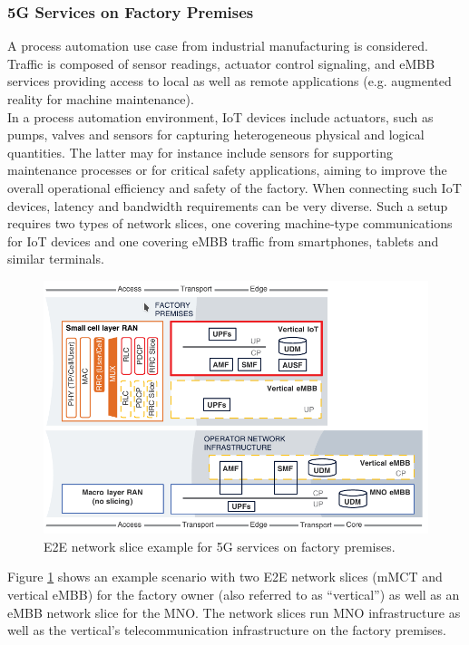\documentclass{report}
\begin{document}
\subsubsection{5G Services on Factory Premises}
A process automation use case from industrial manufacturing is considered. Traffic is composed of sensor readings, actuator control signaling, and eMBB services providing access to local as well as remote applications (e.g. augmented reality for machine maintenance).\\
In a process automation environment, \gls{IoT} devices include actuators, such as pumps, valves and
sensors for capturing heterogeneous physical and logical quantities. The latter may for instance include sensors for supporting maintenance processes or for critical safety
applications, aiming to improve the overall operational efficiency and safety of the factory. When
connecting such IoT devices, latency and bandwidth requirements can be very diverse. Such a setup
requires two types of network slices, one covering machine‐type communications for IoT devices
and one covering eMBB traffic from smartphones, tablets and similar terminals. 
\begin{figure}
\centering
\includegraphics[scale=0.5]{pics/example.png}
\caption{E2E network slice example for 5G services on factory premises.}
\label{exem} 
\end{figure}
Figure \ref{exem} shows an example scenario with two E2E network slices (mMCT and vertical eMBB) for the factory owner (also
referred to as “vertical”) as well as an eMBB network slice for the MNO. The network slices run MNO infrastructure as well as the vertical’s telecommunication infrastructure on the factory premises.
\end{document}
